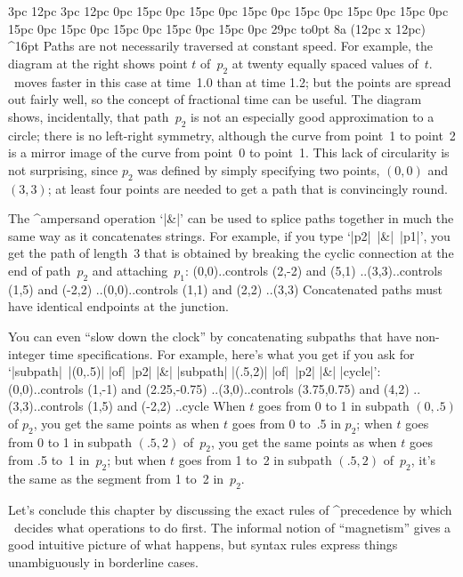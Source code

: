 {{{{{\ninepoint
\medbreak
{} 3pc 12pc 3pc 12pc
0pc 15pc 0pc 15pc 0pc 15pc 0pc 15pc 0pc 15pc 0pc 15pc
0pc 15pc 0pc 15pc 0pc 15pc 0pc 15pc 0pc 15pc 0pc 29pc
\noindent
\hbox to0pt{\hskip-3pc\dbend\hfill}
\rightfig 8a (12pc x 12pc) ^16pt
Paths are not necessarily traversed at constant speed. For example,
the diagram at the right shows point $t$ of~$p_2$ at twenty equally
spaced values of~$t$.
\MF\ moves faster in this case at time~1.0 than at time 1.2; but the
points are spread out fairly well, so the concept of fractional
time can be useful. The diagram shows, incidentally, that
path~$p_2$ is not an especially good approximation to
a circle; there is no left-right symmetry, although the curve from point~1
to point~2 is a mirror image of the curve from point~0 to point~1.
This lack of circularity is not surprising, since
$p_2$ was defined by simply specifying two points, $(0,0)$ and~$(3,3)$;
at least four points are needed to get a path that is convincingly round.
\parfillskip=0pt\par}

\ddanger The ^{ampersand} operation `|&|' can be used to splice paths
together in much the same way as it concatenates strings. For example, if
you type `|p2|~|&|~|p1|', you get the path of length~3 that is obtained by
breaking the cyclic connection at the end of path~$p_2$ and attaching~$p_1$:
\begintt
(0,0)..controls (2,-2) and (5,1)
 ..(3,3)..controls (1,5) and (-2,2)
 ..(0,0)..controls (1,1) and (2,2)
 ..(3,3)
\endtt
Concatenated paths must have identical endpoints at the junction.

\ddanger You can even ``slow down the clock'' by concatenating subpaths
that have non-integer time specifications. For example, here's what you
get if you ask for `|subpath|~|(0,.5)| |of|~|p2| |&| |subpath| |(.5,2)|
|of|~|p2| |&| |cycle|':
\begintt
(0,0)..controls (1,-1) and (2.25,-0.75)
 ..(3,0)..controls (3.75,0.75) and (4,2)
 ..(3,3)..controls (1,5) and (-2,2)
 ..cycle
\endtt
When $t$ goes from 0 to 1 in subpath $(0,.5)$ of $p_2$, you get the same
points as when $t$ goes from 0 to~.5 in $p_2$; when $t$ goes from 0 to 1
in subpath $(.5,2)$ of~$p_2$, you get the same points as when $t$ goes
from .5 to~1 in~$p_2$; but when $t$ goes from 1 to~2 in subpath
$(.5,2)$ of~$p_2$, it's the same as the segment from 1 to~2 in~$p_2$.

\danger Let's conclude this chapter by discussing the exact rules of
^{precedence} by which \MF\ decides what operations to do first. The
informal notion of ``magnetism'' gives a good intuitive picture of what
happens, but syntax rules express things unambiguously in borderline cases.

}}}}
